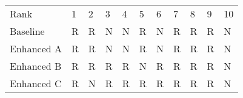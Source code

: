 \begin{tabular}{lllllllllll}
Rank & 1 & 2 & 3 & 4 & 5 & 6 & 7 & 8 & 9 & 10 \\
Baseline & R & R & N & N & R & N & R & R & R & N \\
Enhanced A & R & R & N & N & R & N & R & R & R & N \\
Enhanced B & R & R & R & R & N & R & R & R & R & N \\
Enhanced C & R & N & R & R & R & R & R & R & R & N \\
\end{tabular}
